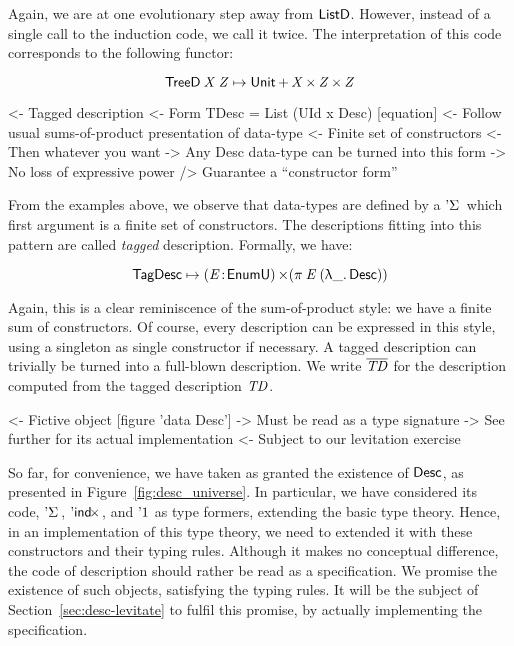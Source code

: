 Again, we are at one evolutionary step away from $\ListD$. However,
instead of a single call to the induction code, we call it twice. The
interpretation of this code corresponds to the following functor:

\[    \TreeD\: \V{X}\: \V{Z} \mapsto \Unit \mathop{\D{+}} \V{X} \Prod \V{Z} \Prod \V{Z}     \]


\begin{wstructure}
<- Tagged description
    <- Form TDesc = List (UId x Desc) [equation]
    <- Follow usual sums-of-product presentation of data-type
        <- Finite set of constructors
        <- Then whatever you want
    -> Any Desc data-type can be turned into this form
        -> No loss of expressive power
        /> Guarantee a ``constructor form''
\end{wstructure}

From the examples above, we observe that data-types are defined by a
$\DSigma{\!}{\!}$ which first argument is a finite set of
constructors. The descriptions fitting into this pattern are called
\emph{tagged} description. Formally, we have:

\[
 \TagDesc \mapsto \SIGMA{\V{E}}{\EnumU} (\spi{\V{E}}{(\LAM{\_} \Desc)})
\]

Again, this is a clear reminiscence of the sum-of-product style:
we have a finite sum of constructors. Of course, every description can
be expressed in this style, using a singleton as single constructor if
necessary. A tagged description can trivially be turned into a
full-blown description. We write $\toDesc{\V{TD}}$ for the description computed
from the tagged description $\V{TD}$.

\begin{wstructure}
<- Fictive object [figure 'data Desc']
    -> Must be read as a type signature
    -> See further for its actual implementation
        <- Subject to our levitation exercise
\end{wstructure}

So far, for convenience, we have taken as granted the existence of
$\Desc$, as presented in Figure~\ref{fig:desc_universe}. In
particular, we have considered its code, $\DSigma{\!}{\!}$,
$\DIndx{\!}$, and $\DUnit$ as type formers, extending the basic type
theory. Hence, in an implementation of this type theory, we need to
extended it with these constructors and their typing rules. Although
it makes no conceptual difference, the code of description should
rather be read as a specification. We promise the existence of such
objects, satisfying the typing rules. It will be the subject of
Section~\ref{sec:desc-levitate} to fulfil this promise, by actually
implementing the specification.

